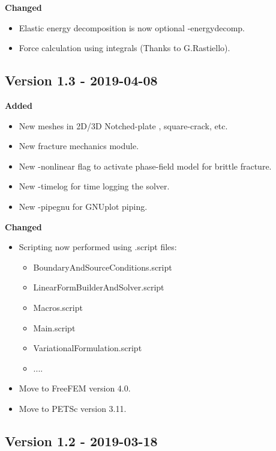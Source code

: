 \documentclass{report}
\begin{document}
\textbf{Changed}
\begin{itemize}
 \item Elastic energy decomposition is now optional {\ttfamily -energydecomp}.
 \item Force calculation using integrals (Thanks to G.Rastiello).
\end{itemize}

\subsection{Version 1.3 - 2019-04-08}

\textbf{Added}
\begin{itemize}
 \item New meshes in 2D/3D {\ttfamily Notched-plate} , {\ttfamily square-crack}, etc.
 \item New fracture mechanics module.
 \item New {\ttfamily -nonlinear} flag to activate phase-field model for brittle fracture.
 \item New {\ttfamily -timelog} for time logging the solver.
 \item New {\ttfamily -pipegnu} for GNUplot piping.
\end{itemize}

\textbf{Changed}
\begin{itemize}
 \item Scripting now performed using {\ttfamily .script} files:
 \begin{itemize}
	\item {\ttfamily BoundaryAndSourceConditions.script}
	\item {\ttfamily LinearFormBuilderAndSolver.script}
	\item {\ttfamily Macros.script} 
	\item {\ttfamily Main.script} 
	\item {\ttfamily VariationalFormulation.script} 
	\item ....
	\end{itemize}
\item Move to FreeFEM version 4.0.
\item Move to PETSc version 3.11.
\end{itemize}

\subsection{Version 1.2 - 2019-03-18}
\end{document}
